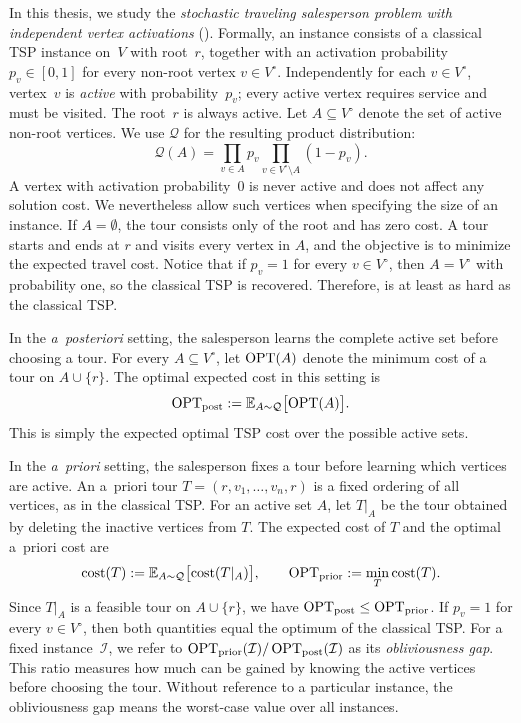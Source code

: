 \documentclass[12pt,a4paper,oneside]{report}
\begin{document}
In this thesis, we study the \emph{stochastic traveling salesperson problem
with independent vertex activations} (\StochTSP{}). Formally, an instance consists of a
classical TSP instance on~$V$ with root~$r$, together with an activation
probability $p_v\in[0,1]$ for every non-root vertex $v\in V^\circ$.
Independently for each $v\in V^\circ$, vertex~$v$ is \emph{active} with
probability~$p_v$; every active vertex requires service and must be visited.
The root~$r$ is always active. Let $A \subseteq V^\circ$ denote the set of
active non-root vertices.
We use $\mathcal{Q}$ for the resulting product distribution:
\[
\mathcal{Q}(A) = \prod_{v \in A} p_v \prod_{v \in V^\circ \setminus A}(1 - p_v).
\]
A vertex with activation probability~$0$ is never active and does not affect
any solution cost. We nevertheless allow such vertices when specifying the
size of an instance. If $A=\emptyset$, the tour consists only of the root and
has zero cost.
A tour starts and ends at $r$ and visits every vertex in $A$, and the objective is to minimize the expected 
travel cost. Notice that if $p_v=1$ for every $v \in V^\circ$, then $A = V^\circ$ with probability one, so 
the classical TSP is recovered. Therefore, \StochTSP{} is at least as hard as the classical TSP.

In the \emph{a~posteriori} setting, the salesperson learns the complete active
set before choosing a tour. For every $A\subseteq V^\circ$,
let $\operatorname{OPT}(A)$ denote the minimum cost of a tour on $A\cup\{r\}$. The optimal
expected cost in this setting is
\[
    \operatorname{OPT}_\mathrm{post}:=\mathbb{E}_{A\sim\mathcal Q}\bigl[\operatorname{OPT}(A)\bigr].
\]
This is simply the expected optimal TSP cost over the possible active sets.

In the \emph{a~priori} setting, the salesperson fixes a tour before learning
which vertices are active. An a~priori tour
$T=(r,v_1,\ldots,v_n,r)$ is a fixed ordering of all vertices, as in the
classical TSP. For an active set $A$, let $T\vert_A$ be the tour obtained by
deleting the inactive vertices from $T$. The expected cost of $T$ and the
optimal a~priori cost are
\[
    \operatorname{cost}(T):=\mathbb{E}_{A\sim\mathcal Q}\bigl[\operatorname{cost}(T\vert_A)\bigr],
    \qquad
    \operatorname{OPT}_\mathrm{prior}:=\min_T\operatorname{cost}(T).
\]
Since $T\vert_A$ is a feasible tour on $A\cup\{r\}$, we have
$\operatorname{OPT}_\mathrm{post}\le\operatorname{OPT}_\mathrm{prior}$. If $p_v=1$ for every $v\in V^\circ$, then both
quantities equal the optimum of the classical TSP. For a fixed \StochTSP{}
instance~$\mathcal I$, we refer to
$\operatorname{OPT}_\mathrm{prior}(\mathcal I)/\operatorname{OPT}_\mathrm{post}(\mathcal I)$ as its
\emph{obliviousness gap}. This ratio measures how much can be gained by
knowing the active vertices before choosing the tour. Without reference to a
particular instance, the obliviousness gap means the worst-case value over all
\StochTSP{} instances.
\end{document}
